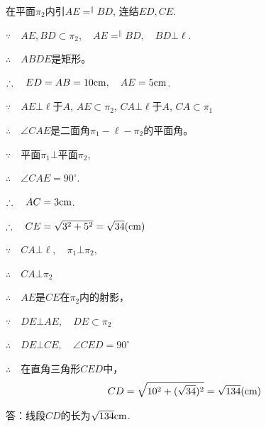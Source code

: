 \begin{solution}
  在平面$\pi_2$内引$AE\displaystyle\mathop{=}^{\parallel}BD$, 连结$ED,CE$.

$\because\quad   AE,BD\subset \pi_2,\quad AE\displaystyle\mathop{=}^{\parallel}BD,\quad BD\bot \ell$.

$\therefore\quad  ABDE$是矩形。

$\therefore\quad ED=AB=10{\rm cm},\quad AE=5{\rm cm}$.

$\because\quad   AE\bot \ell$于$A$, $AE\subset \pi_2$, $CA\bot \ell$于$A$, $CA\subset \pi_1$

$\therefore\quad \angle CAE$是二面角$\pi_1-\ell-\pi_2$的平面角。

$\because\quad $平面$\pi_1\bot$平面$\pi_2$,

$\therefore\quad\angle CAE=90^{\circ}$.

$\therefore\quad AC=3{\rm cm}$.

$\therefore\quad CE=\sqrt{3^2+5^2}=\sqrt{34}{\rm (cm)}$

$\because\quad CA\bot\ell,\quad \pi_1\bot \pi_2$,

$\therefore\quad CA\bot \pi_2$

$\therefore\quad AE$是$CE$在$\pi_2$内的射影，

$\because\quad DE\bot AE,\quad DE\subset \pi_2$

$\therefore\quad DE\bot CE,\quad \angle CED=90^{\circ}$

$\therefore\quad $在直角三角形$CED$中，
\[CD=\sqrt{10^2+(\sqrt{34})^2}=\sqrt{134}{\rm (cm)}\]

答：线段$CD$的长为$\sqrt{134}{\rm cm}$.
\end{solution}    

